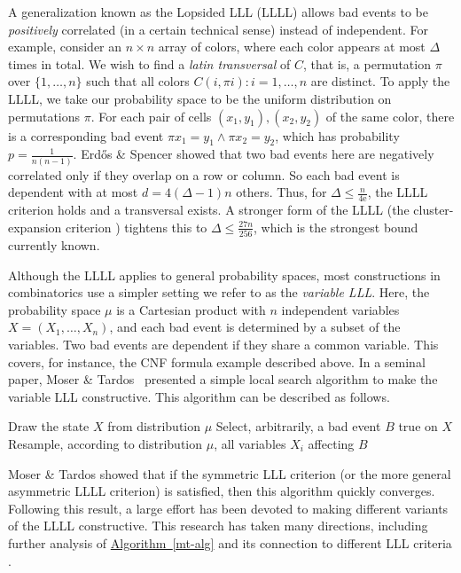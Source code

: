 \documentclass[11pt]{article}
\newcommand{\expref}[2]{\texorpdfstring{\hyperref[#2]{#1~\ref{#2}}}{#1~\ref{#2}}}
\newcommand{\eee}{\mathrm e}
\begin{document}
A generalization known as the Lopsided LLL (LLLL) allows bad events to be \emph{positively} correlated (in a certain technical sense) instead of independent. For example, consider an $n \times n$ array of colors, where each color appears at most $\Delta$ times in total. We wish to find a \emph{latin transversal} of $C$, that is, a permutation $\pi$ over $\{1, \dots, n \}$ such that all colors $C(i, \pi i): i = 1, \dots, n$ are distinct. To apply the LLLL, we take our probability space to be the uniform distribution on permutations $\pi$. For each pair of cells $(x_1, y_1), (x_2, y_2)$ of the same color, there is a corresponding bad event $\pi x_1 = y_1 \wedge \pi x_2 = y_2$, which has probability
$p = \frac{1}{n(n-1)}$.
%
%
%
Erd\H{o}s \& Spencer \cite{LopsTrav} showed that two bad events here are
negatively correlated 
only if they overlap on a row or column. So each bad event is dependent with at most $d = 4 (\Delta-1) n$ others.
Thus, for $\Delta \leq \frac{n}{4 \eee}$, the LLLL criterion holds and a transversal exists. A stronger form of the LLLL (the cluster-expansion criterion \cite{bissacot}) tightens this to $\Delta \leq \frac{27n}{256}$, which is the strongest bound currently known.


Although the LLLL applies to general probability spaces, most constructions in combinatorics use a simpler setting we refer to as the \emph{variable LLL}. Here, the probability space $\mu$ is a Cartesian product with $n$ independent variables $X = (X_1, \dots, X_n)$, and each bad event is determined by a subset of the variables. Two bad events are dependent if they share a common variable. This covers, for instance, the CNF formula example described above. In a seminal
%
paper,  %
Moser \& Tardos~\cite{MT} presented a simple local search algorithm to make the
%
variable LLL   %
constructive. This algorithm can be described 
as follows. %
\begin{algorithm}[H]
\centering
\label{gen-alg}
\begin{algorithmic}[1]
  \State Draw the state $X$ from distribution $\mu$
\State Select, arbitrarily, a bad event $B$ true on $X$
\State Resample, according to distribution $\mu$, all variables $X_i$ affecting $B$
\EndWhile
\end{algorithmic}
\caption{The Moser-Tardos (MT) resampling algorithm}
\label{mt-alg}
\end{algorithm}


Moser \& Tardos showed that if the symmetric LLL criterion (or %
the  %
more general asymmetric LLLL criterion) is satisfied, then this algorithm quickly
converges. Following this %
result,  %
a large effort has been devoted to making different variants  of the LLLL constructive. This research has taken many directions, including further analysis of \expref{Algorithm}{mt-alg} and its connection to different LLL criteria \cite{determ,szege_meet,PegdenIndepen}.
\end{document}
